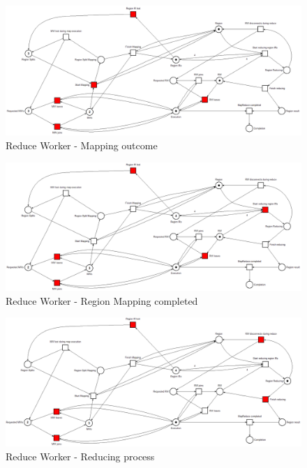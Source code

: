\begin{figure}[!ht]
    \centering
    \includegraphics[width=\linewidth]{document/chapters/chapter_6/images/master_petri_net_4.png}
    \caption{Reduce Worker - Mapping outcome}
    \label{fig:master_petri_net_4}
\end{figure}

\begin{figure}[!ht]
    \centering
    \includegraphics[width=\linewidth]{document/chapters/chapter_6/images/master_petri_net_5.png}
    \caption{Reduce Worker - Region Mapping completed}
    \label{fig:master_petri_net_5}
\end{figure}

\begin{figure}[!ht]
    \centering
    \includegraphics[width=\linewidth]{document/chapters/chapter_6/images/master_petri_net_6.png}
    \caption{Reduce Worker - Reducing process}
    \label{fig:master_petri_net_6}
\end{figure}


